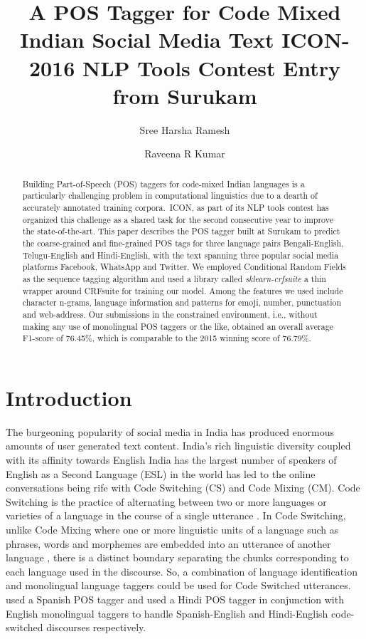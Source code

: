 \documentclass[11pt,a4paper]{article}
\title {A POS Tagger for Code Mixed Indian Social Media Text \textemdash{} ICON-2016 NLP Tools Contest Entry from Surukam}
\author{Sree Harsha Ramesh}
\author{Raveena R Kumar}
\affil{Surukam Analytics, Chennai \protect\\

{\tt \{harsha,raveena\}@surukam.com}}
\begin{document}
 \maketitle

\begin{abstract}
Building Part-of-Speech (POS) taggers for code-mixed Indian languages is a particularly challenging problem in computational linguistics due to a dearth of accurately annotated training corpora.\ ICON, as part of its NLP tools contest has organized this challenge as a shared task for the second consecutive year to improve the state-of-the-art. This paper describes the POS tagger built at Surukam to predict the coarse-grained and fine-grained POS tags for three language pairs \textemdash{} Bengali-English, Telugu-English and Hindi-English, with the text spanning three popular social media platforms \textemdash{} Facebook, WhatsApp and Twitter. We employed Conditional Random Fields as the sequence tagging algorithm and used a library called \textit{sklearn-crfsuite} \textemdash{} a thin wrapper around CRFsuite for training our model.
Among the features we used include \textemdash{} character n-grams, language information and patterns for emoji, number, punctuation and web-address. 
Our submissions in the constrained environment, i.e., without making any use of monolingual POS taggers or the like, obtained an overall average F1-score of 76.45\%, which is comparable to the 2015 winning score of 76.79\%. 
\end{abstract}

\section{Introduction}

The burgeoning popularity of social media in India has produced enormous amounts of user generated text content. India\rq{}s rich linguistic diversity coupled with its affinity towards English \textemdash{} India has the largest number of speakers of English as a Second Language (ESL) in the world \textemdash{} has led to the online conversations being rife with Code Switching (CS) and Code Mixing (CM). Code Switching is the practice of alternating between two or more languages or varieties of a language in the course of a single utterance \cite{Gumperz:82}. In Code Switching,  unlike Code Mixing where one or more linguistic units of a language such as phrases, words and morphemes are embedded into an utterance of another language \cite{Myers-Scotton:97}, there is a distinct boundary separating the chunks corresponding to each language used in the discourse. So, a combination of language identification and monolingual language taggers could be used for Code Switched utterances.  used a Spanish POS tagger and  used a Hindi POS tagger in conjunction with English monolingual taggers to handle Spanish-English and Hindi-English code-switched discourses respectively.
\end{document}
